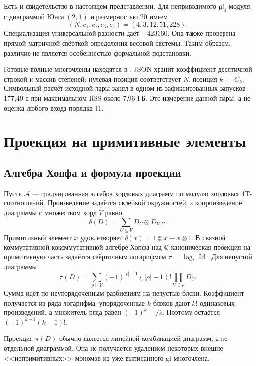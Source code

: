 \documentclass[11pt,a4paper]{article}
\numberwithin{equation}{section}
\theoremstyle{definition}
\theoremstyle{remark}
\newcommand{\gl}{\mathfrak{gl}}
\newcommand{\Q}{\mathbb Q}
\newcommand{\repo}[2]{\href{https://github.com/TheMrX1/gl-weight-systems/blob/main/#1}{\texttt{\detokenize{#2}}}}
\begin{document}
Есть и свидетельство в настоящем представлении. Для неприводимого
$\gl_4$-модуля с диаграммой Юнга $(2,1)$ и размерностью 20 имеем
\[
 (N,c_1,c_2,c_3,c_4)=(4,3,12,51,228).
\]
Специализация универсальной разности даёт $-423360$. Она также проверена
прямой матричной свёрткой определения весовой системы. Таким образом,
различие не является особенностью формальной подстановки.

Готовые полные многочлены находятся в
\repo{results/mutants11/D_ordinary.json}{results/mutants11/}.
JSON хранит коэффициент десятичной строкой и массив степеней:
нулевая позиция соответствует $N$, позиция $k$ --- $C_k$.
Символьный расчёт исходной пары занял в одном из зафиксированных запусков
177{,}49 с при максимальном RSS около 7{,}96 ГБ. Это измерение данной
пары, а не оценка любого входа порядка 11.

\section{Проекция на примитивные элементы}
\label{sec:primitive}

\subsection{Алгебра Хопфа и формула проекции}

Пусть $\mathcal A$ --- градуированная алгебра хордовых диаграмм по модулю
хордовых 4T-соотношений. Произведение задаётся склейкой окружностей,
а копроизведение диаграммы с множеством хорд $V$ равно
\[
 \delta(D)=\sum_{U\subseteq V}D_U\otimes D_{V\setminus U}.
\]
Примитивный элемент $x$ удовлетворяет
$\delta(x)=1\otimes x+x\otimes1$.
В связной коммутативной кокоммутативной алгебре Хопфа над $\Q$
каноническая проекция на примитивную часть задаётся свёрточным
логарифмом $\pi=\log_*\operatorname{Id}$. Для непустой диаграммы
\begin{equation}\label{eq:primitive}
 \pi(D)=\sum_{\rho\vdash V}
 (-1)^{|\rho|-1}(|\rho|-1)!\prod_{U\in\rho}D_U.
\end{equation}
Сумма идёт по неупорядоченным разбиениям на непустые блоки.
Коэффициент получается из ряда логарифма: упорядоченные $k$ блоков
дают $k!$ одинаковых произведений, а множитель ряда равен
$(-1)^{k-1}/k$. Поэтому остаётся $(-1)^{k-1}(k-1)!$.

Проекция $\pi(D)$ обычно является линейной комбинацией диаграмм,
а не отдельной диаграммой. Она не получается удалением некоторых
внешне <<непримитивных>> мономов из уже выписанного gl-многочлена.
\end{document}
